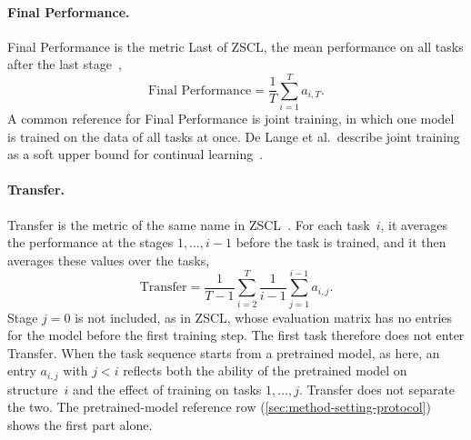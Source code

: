 \paragraph{Final Performance.}
Final Performance is the metric Last of ZSCL, the mean performance on all tasks after the last stage~\cite[Sec.~4, Fig.~4b]{zheng2023preventingzeroshottransferdegradation},
\begin{equation}
\text{Final Performance} = \frac{1}{T} \sum_{i=1}^{T} a_{i,T}.
\label{eq:bg-final}
\end{equation}
A common reference for Final Performance is joint training, in which one model is trained on the data of all tasks at once.
De Lange et al.\ describe joint training as a soft upper bound for continual learning~\cite[Sec.~5]{delange2022}.

\paragraph{Transfer.}
Transfer is the metric of the same name in ZSCL~\cite[Sec.~4, Fig.~4b]{zheng2023preventingzeroshottransferdegradation}.
For each task~$i$, it averages the performance at the stages $1, \dots, i-1$ before the task is trained, and it then averages these values over the tasks,
\begin{equation}
\text{Transfer} = \frac{1}{T-1} \sum_{i=2}^{T} \frac{1}{i-1} \sum_{j=1}^{i-1} a_{i,j}.
\label{eq:bg-transfer}
\end{equation}
Stage $j = 0$ is not included, as in ZSCL, whose evaluation matrix has no entries for the model before the first training step.
The first task therefore does not enter Transfer.
When the task sequence starts from a pretrained model, as here, an entry $a_{i,j}$ with $j < i$ reflects both the ability of the pretrained model on structure~$i$ and the effect of training on tasks $1, \dots, j$.
Transfer does not separate the two.
The pretrained-model reference row (\cref{sec:method-setting-protocol}) shows the first part alone.


